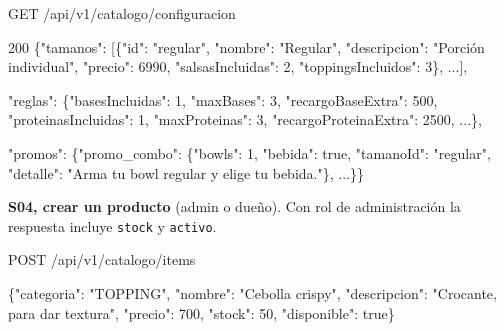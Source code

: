 \begin{codigo}
GET /\allowbreak{}api/\allowbreak{}v1/\allowbreak{}catalogo/\allowbreak{}configuracion\par
\end{codigo}

\begin{codigo}
200 \{"tamanos":\allowbreak{} [\allowbreak{}\{"id":\allowbreak{} "regular",\allowbreak{} "nombre":\allowbreak{} "Regular",\allowbreak{} "descripcion":\allowbreak{} "Porción individual",\allowbreak{} "precio":\allowbreak{} 6990,\allowbreak{} "salsasIncluidas":\allowbreak{} 2,\allowbreak{} "toppingsIncluidos":\allowbreak{} 3\},\allowbreak{} .\allowbreak{}.\allowbreak{}.\allowbreak{}],\allowbreak{}\par
\hspace*{5\ttw}"reglas":\allowbreak{} \{"basesIncluidas":\allowbreak{} 1,\allowbreak{} "maxBases":\allowbreak{} 3,\allowbreak{} "recargoBaseExtra":\allowbreak{} 500,\allowbreak{} "proteinasIncluidas":\allowbreak{} 1,\allowbreak{} "maxProteinas":\allowbreak{} 3,\allowbreak{} "recargoProteinaExtra":\allowbreak{} 2500,\allowbreak{} .\allowbreak{}.\allowbreak{}.\allowbreak{}\},\allowbreak{}\par
\hspace*{5\ttw}"promos":\allowbreak{} \{"promo\_\allowbreak{}combo":\allowbreak{} \{"bowls":\allowbreak{} 1,\allowbreak{} "bebida":\allowbreak{} true,\allowbreak{} "tamanoId":\allowbreak{} "regular",\allowbreak{} "detalle":\allowbreak{} "Arma tu bowl regular y elige tu bebida.\allowbreak{}"\},\allowbreak{} .\allowbreak{}.\allowbreak{}.\allowbreak{}\}\}\par
\end{codigo}

\textbf{S04, crear un producto} (admin o dueño). Con rol de administración la respuesta incluye \texttt{stock} y \texttt{activo}.


\begin{codigo}
POST /\allowbreak{}api/\allowbreak{}v1/\allowbreak{}catalogo/\allowbreak{}items\par
\{"categoria":\allowbreak{} "TOPPING",\allowbreak{} "nombre":\allowbreak{} "Cebolla crispy",\allowbreak{} "descripcion":\allowbreak{} "Crocante,\allowbreak{} para dar textura",\allowbreak{} "precio":\allowbreak{} 700,\allowbreak{} "stock":\allowbreak{} 50,\allowbreak{} "disponible":\allowbreak{} true\}\par
\end{codigo}

